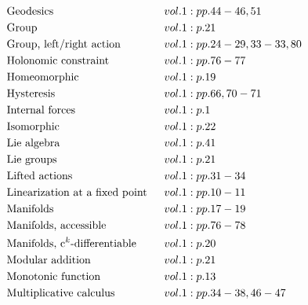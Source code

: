 \documentclass[a4paper]{article}
\begin{document}
\begin{align*}
&\text{Geodesics} \hspace*{0.55556em}&& vol. 1: pp. 44-46, 51\\
&\text{Group} \hspace*{0.55556em}&& vol. 1: p. 21\\
&\text{Group, left/right action} \hspace*{0.55556em}&& vol. 1: pp. 24-29, 33-33, 80\\
&\text{Holonomic constraint} \hspace*{0.55556em}&& vol. 1: pp. 76-77\\
&\text{Homeomorphic} \hspace*{0.55556em}&& vol. 1: p. 19\\
&\text{Hysteresis} \hspace*{0.55556em}&& vol. 1: pp. 66, 70-71\\
&\text{Internal forces} \hspace*{0.55556em}&& vol. 1: p. 1\\
&\text{Isomorphic} \hspace*{0.55556em}&& vol. 1: p. 22\\
&\text{Lie algebra} \hspace*{0.55556em}&& vol. 1: p. 41\\
&\text{Lie groups} \hspace*{0.55556em}&& vol. 1: p. 21\\
&\text{Lifted actions} \hspace*{0.55556em}&& vol. 1: pp. 31-34\\
&\text{Linearization at a fixed point} \hspace*{0.55556em}&& vol. 1: pp. 10-11\\
&\text{Manifolds} \hspace*{0.55556em}&& vol. 1: pp. 17-19\\
&\text{Manifolds, accessible} \hspace*{0.55556em}&& vol. 1: pp. 76-78\\
&\text{Manifolds, c$^k$-differentiable} \hspace*{0.55556em}&& vol. 1: p. 20\\
&\text{Modular addition} \hspace*{0.55556em}&& vol. 1: p. 21\\
&\text{Monotonic function} \hspace*{0.55556em}&& vol. 1: p. 13\\
&\text{Multiplicative calculus} \hspace*{0.55556em}&& vol. 1: pp. 34-38, 46-47\\

\end{align*}
\end{document}
